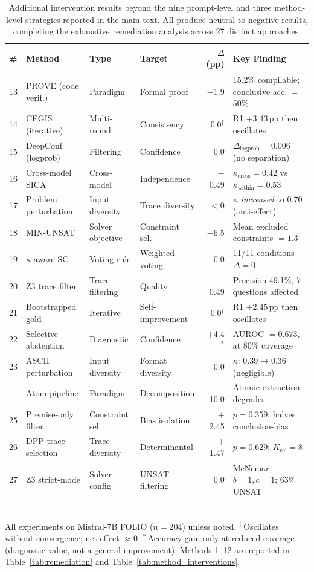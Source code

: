 \begin{table}[h]
\centering
\small
\caption{Additional intervention results beyond the nine prompt-level and three method-level strategies reported in the main text. All produce neutral-to-negative results, completing the exhaustive remediation analysis across 27 distinct approaches.}
\label{tab:additional_interventions}
\begin{tabular}{@{}llllrl@{}}
\toprule
\# & Method & Type & Target & $\Delta$ (pp) & Key Finding \\
\midrule
13 & PROVE (code verif.) & Paradigm & Formal proof & $-$1.9 & 15.2\% compilable; conclusive acc.\ = 50\% \\
14 & CEGIS (iterative) & Multi-round & Consistency & 0.0$^\dagger$ & R1 $+$3.43\,pp then oscillates \\
15 & DeepConf (logprob) & Filtering & Confidence & 0.0 & $\Delta_{\text{logprob}} = 0.006$ (no separation) \\
16 & Cross-model SICA & Cross-model & Independence & $-$0.49 & $\kappa_{\text{cross}}{=}0.42$ vs $\kappa_{\text{within}}{=}0.53$ \\
17 & Problem perturbation & Input diversity & Trace diversity & $<$0 & $\kappa$ \emph{increased} to 0.70 (anti-effect) \\
18 & MIN-UNSAT & Solver objective & Constraint sel.\ & $-$6.5 & Mean excluded constraints $= 1.3$ \\
19 & $\kappa$-aware SC & Voting rule & Weighted voting & 0.0 & 11/11 conditions $\Delta = 0$ \\
20 & Z3 trace filter & Trace filtering & Quality & $-$0.49 & Precision 49.1\%, 7 questions affected \\
21 & Bootstrapped gold & Iterative & Self-improvement & 0.0$^\dagger$ & R1 $+$2.45\,pp then oscillates \\
22 & Selective abstention & Diagnostic & Confidence & $+$4.4$^*$ & AUROC $= 0.673$, at 80\% coverage \\
23 & ASCII perturbation & Input diversity & Format diversity & 0.0 & $\kappa$: $0.39 \to 0.36$ (negligible) \\
\addlinespace
24 & Atom pipeline & Paradigm & Decomposition & $-$10.0 & Atomic extraction degrades \\
25 & Premise-only filter & Constraint sel.\ & Bias isolation & $+$2.45 & $p = 0.359$; halves conclusion-bias \\
26 & DPP trace selection & Trace diversity & Determinantal & $+$1.47 & $p = 0.629$; $K_{\text{sel}}{=}8$ \\
27 & Z3 strict-mode & Solver config & UNSAT filtering & 0.0 & McNemar $b{=}1, c{=}1$; 63\% UNSAT \\
\bottomrule
\end{tabular}\\[2pt]
{\footnotesize All experiments on Mistral-7B FOLIO ($n{=}204$) unless noted. $^\dagger$\,Oscillates without convergence; net effect $\approx 0$. $^*$\,Accuracy gain only at reduced coverage (diagnostic value, not a general improvement). Methods 1--12 are reported in Table~\ref{tab:remediation} and Table~\ref{tab:method_interventions}.}
\end{table}

